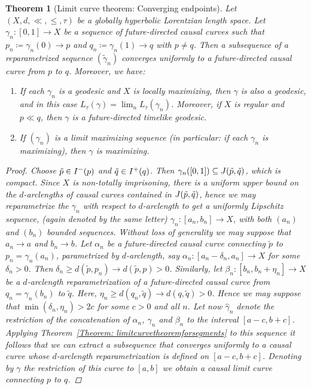 \documentclass[a4paper,11pt]{article}
\numberwithin{equation}{section}
\theoremstyle{plain}
\newtheorem{Theorem}[Definition]{Theorem}
\theoremstyle{definition}
\begin{document}
\begin{Theorem}[Limit curve theorem: Converging endpoints]
\label{Theorem: Limitcurvetheoremtwoendpointcase}
Let $(X,d,\ll,\leq,\tau)$ be a globally hyperbolic Lorentzian length space. Let $\gamma_n \colon [0,1] \to X$ be a sequence of future-directed causal curves such that $p_n \coloneqq \gamma_n(0) \to p$ and $q_n \coloneqq \gamma_n(1) \to q$ with $p\ne q$. Then a subsequence of a reparametrized sequence $(\tilde{\gamma}_n)$ converges uniformly to a future-directed causal curve from $p$ to $q$. Moreover, we have:
\begin{enumerate}
\item\label{217i} If each $\gamma_n$ is a geodesic and $X$ is locally maximizing, then $\gamma$ is also a geodesic, and in this case $L_\tau(\gamma) = \lim_n L_\tau(\gamma_n)$. Moreover, if $X$ is regular and $p \ll q$, then $\gamma$ is a future-directed timelike geodesic.
\item\label{217ii} If $(\gamma_n)$ is a limit maximizing sequence (in particular: if each $\gamma_n$ is maximizing), then $\gamma$ is maximizing.
\end{enumerate}
\begin{proof}
    Choose $\Tilde{p} \in I^-(p)$ and $\Tilde{q} \in I^+(q)$. Then $\gamma_n([0,1]) \subseteq J(\Tilde{p}, \Tilde{q})$, which is compact. Since $X$ is non-totally imprisoning, there is a uniform upper bound on the $d$-arclengths of causal curves contained in $J(\Tilde{p},\Tilde{q})$, hence we may reparametrize the $\gamma_n$ with respect to $d$-arclength to get a uniformly Lipschitz sequence,
    (again denoted by the same letter) $\gamma_n \colon [a_n,b_n] \to X$, with both $(a_n)$ and $(b_n)$ bounded sequences. Without loss of generality we may suppose that $a_n\to a$ and $b_n\to b$. Let $\alpha_n$ be a future-directed causal curve connecting $\tilde{p}$ to $p_n=\gamma_n(a_n)$, parametrized by $d$-arclength, say $\alpha_n \colon [a_n-\delta_n,a_n] \to X$ for some $\delta_n>0$. Then $\delta_n \ge d(\tilde{p},p_n) \to d(\tilde{p},p)>0$. Similarly, let $\beta_n \colon [b_n,b_n+\eta_n] \to X$ be a $d$-arclength reparametrization of a future-directed causal curve from $q_n=\gamma_n(b_n)$ to $\tilde{q}$. Here, $\eta_n \ge d(q_n,\tilde{q}) \to d(q,\tilde{q})>0$. Hence we may suppose that $\min(\delta_n,\eta_n)>2c$ for some $c>0$ and all $n$. Let now $\hat{\gamma}_n$ denote the restriction of the concatenation of $\alpha_n$, $\gamma_n$ and $\beta_n$ to the interval $[a-c,b+c]$. Applying Theorem~\ref{Theorem: limitcurvetheoremforsegments} to this sequence it follows that we can extract a subsequence that converges uniformly to a causal curve whose $d$-arclength reparametrization is defined on $[a-c,b+c]$. 
    Denoting by $\gamma$ the restriction of this curve to $[a,b]$ we obtain a causal limit curve connecting $p$ to $q$.
   

\end{proof}
\end{Theorem}
\end{document}
